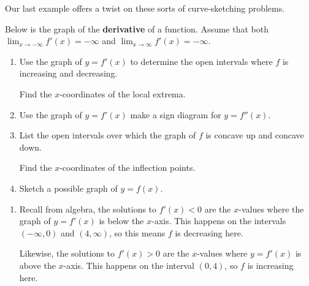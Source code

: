 \documentclass{ximera}
\begin{document}
Our last example offers a twist on these sorts of curve-sketching problems.

\begin{example}\label{graphfromderivativegraphex} Below is the graph of the \textbf{derivative} of a function.  Assume that both $\lim_{x \rightarrow -\infty} f'(x) = -\infty$ and $\lim_{x \rightarrow \infty} f'(x) = -\infty$.

\begin{center}
\end{center}

\begin{enumerate}

\item  Use the graph of $y=f'(x)$ to determine the open intervals where $f$ is increasing and decreasing.  

Find the $x$-coordinates of the local extrema.



\item  Use the graph of $y=f'(x)$ make a sign diagram for $y=f''(x)$.



\item  List the open intervals over which the graph of $f$ is concave up and concave down.  



Find the $x$-coordinates of the inflection points. 



\item  Sketch a possible graph of $y = f(x)$.

\end{enumerate}



\begin{explanation}

\begin{enumerate}

\item  Recall from algebra, the solutions to $f'(x) < 0$ are the $x$-values where the graph of $y = f'(x)$  is below the $x$-axis.  This happens on the intervals $(-\infty, 0)$ and $(4, \infty)$, so this means  $f$ is decreasing here.  

Likewise,  the solutions to $f'(x) > 0$ are the $x$-values where $y=f'(x)$ is above the $x$-axis.  This happens on the interval $(0,4)$, so $f$ is increasing here.  


\end{enumerate}
\end{explanation}
\end{example}
\end{document}
